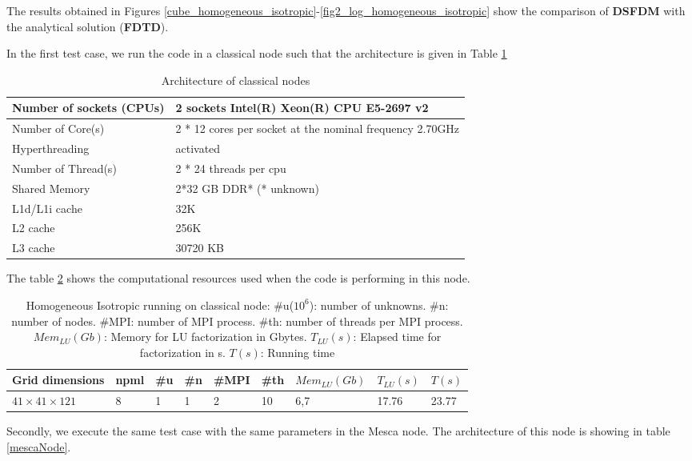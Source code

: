 The results obtained in Figures \ref{cube_homogeneous_isotropic}-\ref{fig2_log_homogeneous_isotropic} show the comparison of \textbf{DSFDM} with the analytical solution (\textbf{FDTD}).
 
In the first test case, we run the code in a classical node such that the architecture is given in Table \ref{mannyNode} \newline

\begin{table}[!h]
\centering

\begin{tabular}{|l|l|}
\hline
Number of sockets (CPUs) & 2 sockets Intel(R) Xeon(R) CPU E5-2697 v2 	\\	
\hline
Number of Core(s) & 2 * 12 cores per socket at the nominal frequency 2.70GHz	\\	
\hline
Hyperthreading & activated			\\
\hline
Number of Thread(s) &  2 * 24 threads per cpu	\\
\hline
Shared Memory & 2*32 GB DDR*  (* unknown) \\	
\hline		
L1d/L1i cache &         32K	\\		
\hline
L2 cache &              256K	\\	
\hline	
L3 cache &             30720 KB	\\
\hline
\end{tabular}
\caption{Architecture of classical nodes}
\label{mannyNode}
\end{table}

The table \ref{manny} shows the computational resources used when the code is performing in this node.
\begin{table}[!h]
\centering

\begin{tabular}{lllllllll}
Grid dimensions & npml & \#u & \#n & \#MPI & \#th & $Mem_{LU}(Gb)$ & $T_{LU}(s)$ & $T(s)$ \\
 \hline
$41 \times 41 \times 121$ & 8 & 1 & 1 & 2  & 10 & 6,7 &  17.76 & 23.77 
\end{tabular}
\caption{Homogeneous Isotropic running on classical node: \#u($ 10^{6} $): number of unknowns. \#n: number of nodes. \#MPI: number of MPI process. \#th: number of threads per MPI process. $Mem_{LU}(Gb)$: Memory for LU
factorization in Gbytes. $T_{LU}(s)$: Elapsed time for factorization in s. $ T(s)$: Running time}
\label{manny}
\end{table}

Secondly, we execute the same test case with the same parameters in the Mesca node. The architecture of this node is showing in table \ref{mescaNode}.

